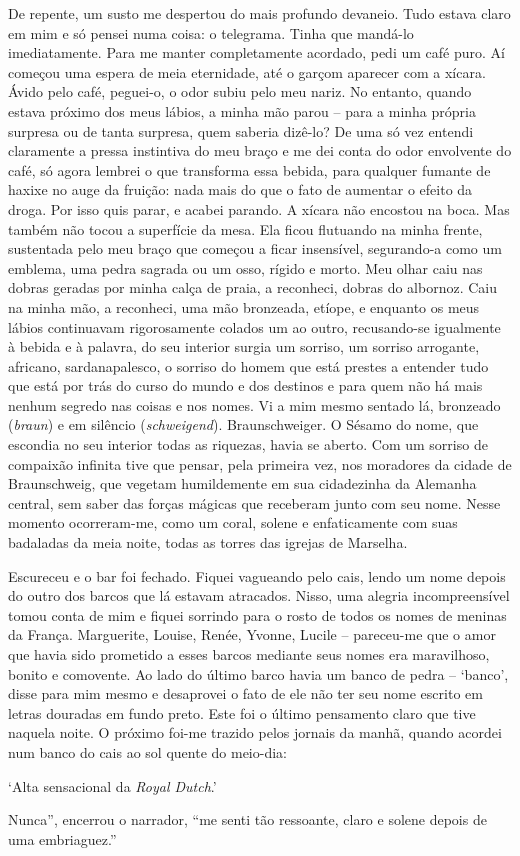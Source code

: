 De repente, um susto me despertou do mais profundo devaneio. Tudo estava
claro em mim e só pensei numa coisa: o telegrama. Tinha que mandá-lo
imediatamente. Para me manter completamente acordado, pedi um café puro.
Aí começou uma espera de meia eternidade, até o garçom aparecer com a
xícara. Ávido pelo café, peguei-o, o odor subiu pelo meu nariz. No
entanto, quando estava próximo dos meus lábios, a minha mão parou --
para a minha própria surpresa ou de tanta surpresa, quem saberia
dizê-lo? De uma só vez entendi claramente a pressa instintiva do meu
braço e me dei conta do odor envolvente do café, só agora lembrei o que
transforma essa bebida, para qualquer fumante de haxixe no auge da
fruição: nada mais do que o fato de aumentar o efeito da droga. Por isso
quis parar, e acabei parando. A xícara não encostou na boca. Mas também
não tocou a superfície da mesa. Ela ficou flutuando na minha frente,
sustentada pelo meu braço que começou a ficar insensível, segurando-a
como um emblema, uma pedra sagrada ou um osso, rígido e morto. Meu olhar
caiu nas dobras geradas por minha calça de praia, a reconheci, dobras do
albornoz. Caiu na minha mão, a reconheci, uma mão bronzeada, etíope, e
enquanto os meus lábios continuavam rigorosamente colados um ao outro,
recusando-se igualmente à bebida e à palavra, do seu interior surgia um
sorriso, um sorriso arrogante, africano, sardanapalesco, o sorriso do
homem que está prestes a entender tudo que está por trás do curso do
mundo e dos destinos e para quem não há mais nenhum segredo nas coisas e
nos nomes. Vi a mim mesmo sentado lá, bronzeado (\emph{braun}) e em
silêncio (\emph{schweigend}). Braunschweiger. O Sésamo do nome, que
escondia no seu interior todas as riquezas, havia se aberto. Com um
sorriso de compaixão infinita tive que pensar, pela primeira vez, nos
moradores da cidade de Braunschweig, que vegetam humildemente em sua
cidadezinha da Alemanha central, sem saber das forças mágicas que
receberam junto com seu nome. Nesse momento ocorreram-me, como um coral,
solene e enfaticamente com suas badaladas da meia noite, todas as torres
das igrejas de Marselha.

Escureceu e o bar foi fechado. Fiquei vagueando pelo cais, lendo um nome
depois do outro dos barcos que lá estavam atracados. Nisso, uma alegria
incompreensível tomou conta de mim e fiquei sorrindo para o rosto de
todos os nomes de meninas da França. Marguerite, Louise, Renée, Yvonne,
Lucile -- pareceu-me que o amor que havia sido prometido a esses barcos
mediante seus nomes era maravilhoso, bonito e comovente. Ao lado do
último barco havia um banco de pedra -- `banco', disse para mim mesmo e
desaprovei o fato de ele não ter seu nome escrito em letras douradas em
fundo preto. Este foi o último pensamento claro que tive naquela noite.
O próximo foi-me trazido pelos jornais da manhã, quando acordei num
banco do cais ao sol quente do meio-dia:

`Alta sensacional da \emph{Royal Dutch}.'

Nunca'', encerrou o narrador, ``me senti tão ressoante, claro e solene
depois de uma embriaguez.''